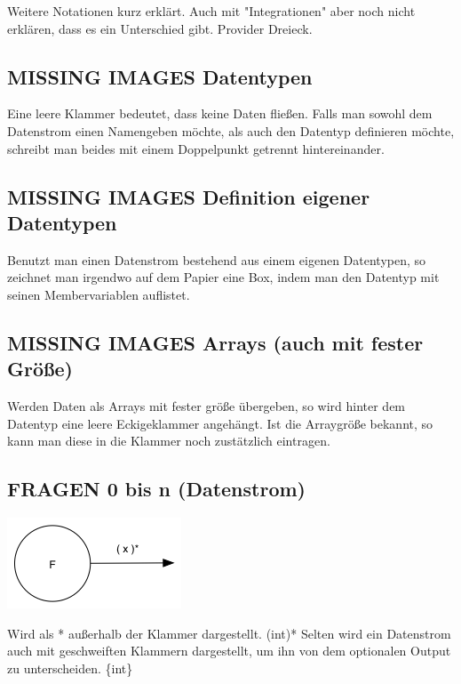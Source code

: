 \documentclass[11pt]{article}
\begin{document}
Weitere Notationen kurz erklärt. Auch mit "Integrationen" aber noch nicht erklären, dass es ein Unterschied gibt.
Provider Dreieck.
\subsection{{\bfseries\sffamily MISSING IMAGES} Datentypen}
\label{sec:orgheadline5}

Eine leere Klammer bedeutet, dass keine Daten fließen.
Falls man sowohl dem Datenstrom einen Namengeben möchte, als auch den Datentyp definieren möchte, schreibt man beides mit einem
Doppelpunkt getrennt hintereinander.
\subsection{{\bfseries\sffamily MISSING IMAGES} Definition eigener Datentypen}
\label{sec:orgheadline6}
Benutzt man einen Datenstrom bestehend aus einem eigenen Datentypen, so zeichnet man irgendwo auf dem Papier eine Box,
indem man den Datentyp mit seinen Membervariablen auflistet.

\subsection{{\bfseries\sffamily MISSING IMAGES} Arrays (auch mit fester Größe)}
\label{sec:orgheadline7}
Werden Daten als Arrays mit fester größe übergeben, so wird hinter dem Datentyp eine leere Eckigeklammer angehängt.
Ist die Arraygröße bekannt, so kann man diese in die Klammer noch zustätzlich eintragen.
\subsection{{\bfseries\sffamily FRAGEN} 0 bis n (Datenstrom)}
\label{sec:orgheadline8}

\includegraphics[width=.9\linewidth]{./img/diagram0n.png}

Wird als * außerhalb der Klammer dargestellt.
(int)*
Selten wird ein Datenstrom auch mit geschweiften Klammern dargestellt, um ihn von dem optionalen Output zu unterscheiden.
\{int\}
\end{document}
